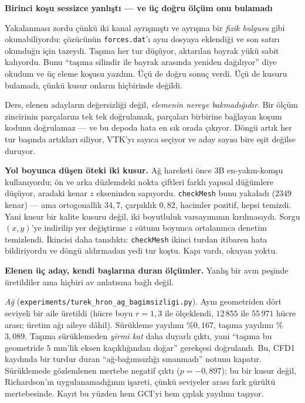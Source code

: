 \documentclass[11pt,a4paper]{article}
\newcommand{\kkkenar}{lacivert}
\newcommand{\kkzemin}{kod}
\newenvironment{renkkutu}[3]{%
  \renewcommand{\kkkenar}{#1}\renewcommand{\kkzemin}{#2}%
  \par\medskip\noindent
  \begin{lrbox}{\kutugovde}%
  \begin{minipage}{\dimexpr\linewidth-2\fboxsep-2\fboxrule\relax}\footnotesize
  \textcolor{#1}{\textbf{#3}}\par\vspace{3pt}%
}{%
  \end{minipage}%
  \end{lrbox}%
  \noindent\fcolorbox{\kkkenar}{\kkzemin}{\usebox{\kutugovde}}%
  \par\medskip
}
\newenvironment{dikkat}[1]{\begin{renkkutu}{orta}{ortabg}{#1}}{\end{renkkutu}}
\begin{document}
\begin{description}
\begin{dikkat}{Birinci koşu sessizce yanlıştı --- ve üç doğru ölçüm onu bulamadı}
        Yakalanması zordu çünkü iki kanal ayrışmıştı ve ayrışma bir
        \emph{fizik bulgusu} gibi okunabiliyordu: çözücünün
        \texttt{forces.dat}'ı aynı dosyaya eklendiği ve son satırı
        okunduğu için tazeydi. Taşıma her tur düşüyor, aktarılan bayrak
        yükü sabit kalıyordu. Bunu ``taşıma silindir ile bayrak arasında
        yeniden dağılıyor'' diye okudum ve üç eleme koşusu yazdım. Üçü de
        doğru sonuç verdi. Üçü de kusuru bulamadı, çünkü kusur onların
        hiçbirinde değildi.

        Ders, elenen adayların değersizliği değil, \emph{elemenin nereye
        bakmadığıdır}. Bir ölçüm zincirinin parçalarını tek tek
        doğrulamak, parçaları birbirine bağlayan koşum kodunu doğrulamaz
        --- ve bu depoda hata en sık orada çıkıyor. Döngü artık her tur
        başında artıkları siliyor, VTK'yı sayıca seçiyor ve aday sayısı
        bire eşit değilse duruyor.
        \end{dikkat}

        \noindent \textbf{Yol boyunca düşen öteki iki kusur.} Ağ hareketi
        önce 3B en-yakın-komşu kullanıyordu; ön ve arka düzlemdeki nokta
        çiftleri farklı yapısal düğümlere düşüyor, aradaki kenar $z$
        ekseninden sapıyordu. \texttt{checkMesh} bunu yakaladı ($2349$
        kenar) --- ama ortogonallik $34{,}7$, çarpıklık $0{,}82$, hacimler
        pozitif, hepsi temizdi. Yani kusur bir kalite kusuru değil, iki
        boyutluluk varsayımının kırılmasıydı. Sorgu $(x,y)$'ye indirilip
        yer değiştirme $z$ sütunu boyunca ortalanınca denetim temizlendi.
        İkincisi daha tanıdıktı: \texttt{checkMesh} ikinci turdan itibaren
        hata bildiriyordu ve döngü aldırmadan yedi tur koştu. Kapı vardı,
        okuyan yoktu.

        \medskip
        \noindent \textbf{Elenen üç aday, kendi başlarına duran ölçümler.}
        Yanlış bir avın peşinde üretildiler ama hiçbiri av anlatısına
        bağlı değil.

        \noindent \emph{Ağ}
        (\texttt{experiments/turek\_hron\_ag\_bagimsizligi.py}). Aynı
        geometriden dört seviyeli bir aile üretildi (hücre boyu $r=1{,}3$
        ile ölçeklendi, $12\,855$ ile $55\,971$ hücre arası; üretim ağı
        aileye dâhil). Sürükleme yayılımı \%$0{,}167$, taşıma yayılımı
        \%$3{,}089$. Taşıma sürüklemeden \emph{yirmi kat} daha duyarlı
        çıktı, yani ``taşıma bu geometride $5$ mm'lik eksen kaçıklığından
        doğar'' gerekçesi doğrulandı. Bu, CFD1 kaydında bir turdur duran
        ``ağ-bağımsızlığı sınanmadı'' notunu kapatır. Sürüklemede
        gözlemlenen mertebe negatif çıktı ($p=-0{,}897$); bu bir kusur
        değil, Richardson'ın uygulanamadığının işareti, çünkü seviyeler
        arası fark gürültü mertebesinde. Kayıt bu yüzden hem GCI'yi hem
        çıplak yayılımı taşıyor.


\end{description}
\end{document}

